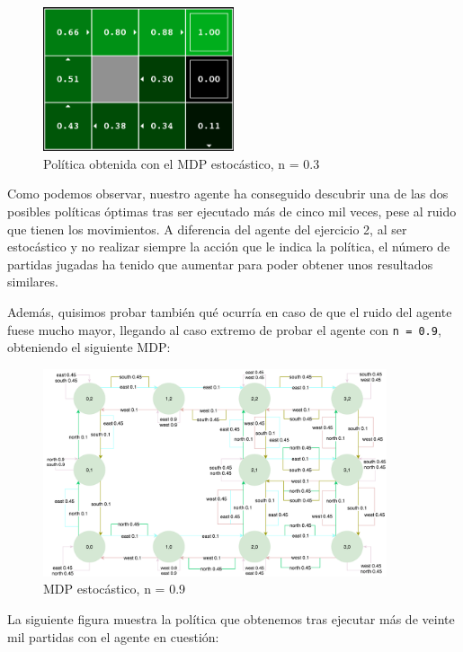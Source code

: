 \documentclass[12pt]{article}
\begin{document}
\begin{figure}[h]
    \centering
    \includegraphics[width=0.5\textwidth]{policy_stochastic03}
    \caption{Política obtenida con el MDP estocástico, n = 0.3}
\end{figure}

Como podemos observar, nuestro agente ha conseguido descubrir una de las dos posibles políticas óptimas tras ser ejecutado más de cinco mil veces, pese al ruido que tienen los movimientos. A diferencia del agente del ejercicio 2, al ser estocástico y no realizar siempre la acción que le indica la política, el número de partidas jugadas ha tenido que aumentar para poder obtener unos resultados similares.

Además, quisimos probar también qué ocurría en caso de que el ruido del agente fuese mucho mayor, llegando al caso extremo de probar el agente con \texttt{n = 0.9}, obteniendo el siguiente MDP:

\begin{figure}[h]
  \centering
    \includegraphics[width=0.9\textwidth]{MDP_stochastic_09}
    \caption{MDP estocástico, n = 0.9}
\end{figure}

\newpage
La siguiente figura muestra la política que obtenemos tras ejecutar más de veinte mil partidas con el agente en cuestión:
\end{document}
